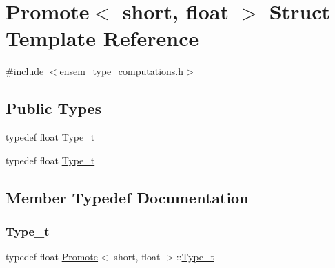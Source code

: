 \hypertarget{structPromote_3_01short_00_01float_01_4}{}\section{Promote$<$ short, float $>$ Struct Template Reference}
\label{structPromote_3_01short_00_01float_01_4}


{\ttfamily \#include $<$ensem\+\_\+type\+\_\+computations.\+h$>$}

\subsection*{Public Types}
\begin{DoxyCompactItemize}
\item 
typedef float \mbox{\hyperlink{structPromote_3_01short_00_01float_01_4_a6c280bd9d625add9fbe42ad7517e59d7}{Type\+\_\+t}}
\item 
typedef float \mbox{\hyperlink{structPromote_3_01short_00_01float_01_4_a6c280bd9d625add9fbe42ad7517e59d7}{Type\+\_\+t}}
\end{DoxyCompactItemize}


\subsection{Member Typedef Documentation}
\mbox{\label{structPromote_3_01short_00_01float_01_4_a6c280bd9d625add9fbe42ad7517e59d7}} 
\subsubsection{\texorpdfstring{Type\_t}{Type\_t}\hspace{0.1cm}{\footnotesize\ttfamily [1/2]}}
{\footnotesize\ttfamily typedef float \mbox{\hyperlink{structPromote}{Promote}}$<$ short, float $>$\+::\mbox{\hyperlink{structPromote_3_01short_00_01float_01_4_a6c280bd9d625add9fbe42ad7517e59d7}{Type\+\_\+t}}}

\mbox{\label{structPromote_3_01short_00_01float_01_4_a6c280bd9d625add9fbe42ad7517e59d7}} 
